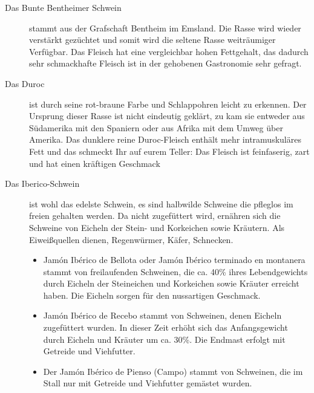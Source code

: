 \begin{description}
	\item[Das Bunte Bentheimer Schwein] stammt aus der Grafschaft 
	Bentheim im Emsland. Die Rasse wird wieder verstärkt gezüchtet und 
	somit wird die seltene Rasse weiträumiger Verfügbar. Das Fleisch hat 
	eine vergleichbar hohen Fettgehalt, das dadurch sehr schmackhafte 
	Fleisch ist in der gehobenen Gastronomie sehr gefragt.
	\item[Das Duroc] ist durch seine rot-braune Farbe und Schlappohren 
	leicht zu erkennen. Der Ursprung dieser Rasse ist nicht eindeutig 
	geklärt, zu kam sie entweder aus Südamerika mit den Spaniern oder 
	aus Afrika mit dem Umweg über Amerika. Das dunklere reine 
	Duroc-Fleisch enthält mehr intramuskuläres Fett und das schmeckt 
	Ihr auf eurem Teller: Das Fleisch ist feinfaserig, zart und hat einen 
	kräftigen Geschmack
	\item[Das Iberico-Schwein] ist wohl das edelste Schwein, es sind 
	halbwilde Schweine die pfleglos im freien gehalten werden. Da nicht 
	zugefüttert wird, ernähren sich die Schweine von Eicheln der Stein- 
	und Korkeichen sowie Kräutern. Als Eiweißquellen dienen, 
	Regenwürmer, Käfer, Schnecken. 
	\begin{itemize}[noitemsep]
		\item Jamón Ibérico de Bellota oder Jamón Ibérico terminado en 
		montanera stammt von freilaufenden Schweinen, die ca. 40\% ihres 
		Lebendgewichts durch Eicheln der Steineichen und Korkeichen 
		sowie Kräuter erreicht haben. Die Eicheln sorgen für den nussartigen 
		Geschmack.
		\item Jamón Ibérico de Recebo stammt von Schweinen, denen Eicheln 
		zugefüttert wurden. In dieser Zeit erhöht sich das Anfangsgewicht 
		durch Eicheln und Kräuter um ca. 30\%. Die Endmast erfolgt mit 
		Getreide und Viehfutter.
		\item Der Jamón Ibérico de Pienso (Campo) stammt von Schweinen, 
		die im Stall nur mit Getreide und Viehfutter gemästet wurden.
	\end{itemize}
\end{description}




